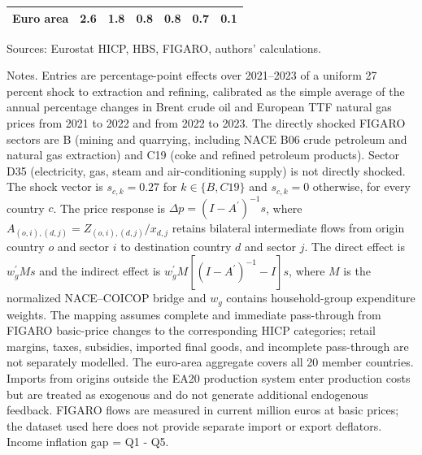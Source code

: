 \begin{table}[H]
\begin{tabular}{lrrrrrr}
 \\
\midrule
\textbf{Euro area} & \textbf{2.6} & \textbf{1.8} & \textbf{0.8} & \textbf{0.8} & \textbf{0.7} & \textbf{0.1}
 \\
\bottomrule
\end{tabular}
\par\vspace{0.35em}\footnotesize\noindent Sources: Eurostat HICP, HBS, FIGARO, authors' calculations.
\par\vspace{0.25em}\footnotesize\noindent Notes. Entries are percentage-point effects over 2021--2023 of a uniform 27 percent shock to extraction and refining, calibrated as the simple average of the annual percentage changes in Brent crude oil and European TTF natural gas prices from 2021 to 2022 and from 2022 to 2023. The directly shocked FIGARO sectors are B (mining and quarrying, including NACE B06 crude petroleum and natural gas extraction) and C19 (coke and refined petroleum products). Sector D35 (electricity, gas, steam and air-conditioning supply) is not directly shocked. The shock vector is $s_{c,k}=0.27$ for $k\in\{B,C19\}$ and $s_{c,k}=0$ otherwise, for every country $c$. The price response is $\Delta p = (I - A^{\prime})^{-1}s$, where $A_{(o,i),(d,j)}=Z_{(o,i),(d,j)}/x_{d,j}$ retains bilateral intermediate flows from origin country $o$ and sector $i$ to destination country $d$ and sector $j$. The direct effect is $w_g^{\prime}Ms$ and the indirect effect is $w_g^{\prime}M[(I-A^{\prime})^{-1}-I]s$, where $M$ is the normalized NACE--COICOP bridge and $w_g$ contains household-group expenditure weights. The mapping assumes complete and immediate pass-through from FIGARO basic-price changes to the corresponding HICP categories; retail margins, taxes, subsidies, imported final goods, and incomplete pass-through are not separately modelled. The euro-area aggregate covers all 20 member countries. Imports from origins outside the EA20 production system enter production costs but are treated as exogenous and do not generate additional endogenous feedback. FIGARO flows are measured in current million euros at basic prices; the dataset used here does not provide separate import or export deflators. Income inflation gap = Q1 - Q5.
\end{table}
\vspace{0.6em}
